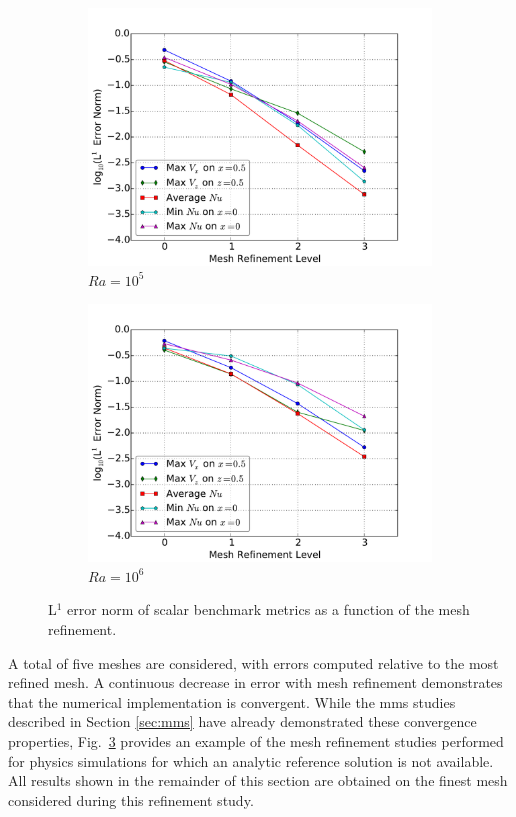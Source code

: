\begin{figure}[!h]
\begin{subfigure}{0.48\textwidth}
  \includegraphics[width=\linewidth]{figs/Ra100000_mr.pdf}
  \caption{\(Ra=10^5\)}
  \label{fig:mr3}
\end{subfigure}
\begin{subfigure}{0.48\textwidth}
  \centering
  \includegraphics[width=\linewidth]{figs/Ra1000000_mr.pdf}
  \caption{\(Ra=10^6\)}
  \label{fig:mr4}
\end{subfigure}
\caption{L$^1$ error norm of scalar benchmark metrics as a function of the mesh refinement.}
\label{fig:mr}
\end{figure}

A total of five meshes are considered, with errors computed relative to the most refined mesh. A continuous decrease in error with mesh refinement demonstrates that the numerical implementation is convergent. While the \gls{mms} studies described in Section \ref{sec:mms} have already demonstrated these convergence properties, Fig.\ \ref{fig:mr} provides an example of the mesh refinement studies performed for physics simulations for which an analytic reference solution is not available. All results shown in the remainder of this section are obtained on the finest mesh considered during this refinement study.


